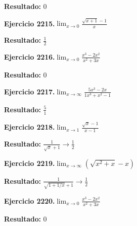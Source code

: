 \documentclass[10pt,a4paper]{article}
\begin{document}
\begin{solbox}
\textbf{Resultado:} \(\displaystyle 0\)
\end{solbox}

\begin{ejbox}
\textbf{Ejercicio 2215.}\quad $\lim_{x\to 0} \frac{\sqrt{x+1}-1}{x}$
\end{ejbox}

\begin{solbox}
\textbf{Resultado:} \(\displaystyle \frac{1}{2}\)
\end{solbox}

\newpage
\begin{ejbox}
\textbf{Ejercicio 2216.}\quad $\lim_{x\to 0} \frac{x^3-2x^2}{x^2+3x}$
\end{ejbox}

\begin{solbox}
\textbf{Resultado:} \(\displaystyle 0\)
\end{solbox}

\begin{ejbox}
\textbf{Ejercicio 2217.}\quad $\lim_{x\to \infty} \frac{5x^3 - 2x}{1x^3 + x^2 - 1}$
\end{ejbox}

\begin{solbox}
\textbf{Resultado:} \(\displaystyle \frac{5}{1}\)
\end{solbox}

\begin{ejbox}
\textbf{Ejercicio 2218.}\quad $\lim_{x\to 1} \frac{\sqrt{x}-1}{x-1}$
\end{ejbox}

\begin{solbox}
\textbf{Resultado:} \(\displaystyle \frac{1}{\sqrt{x}+1} \to \frac{1}{2}\)
\end{solbox}

\newpage
\begin{ejbox}
\textbf{Ejercicio 2219.}\quad $\lim_{x\to \infty} (\sqrt{x^2+x} - x)$
\end{ejbox}

\begin{solbox}
\textbf{Resultado:} \(\displaystyle \frac{1}{\sqrt{1+1/x}+1} \to \frac{1}{2}\)
\end{solbox}

\begin{ejbox}
\textbf{Ejercicio 2220.}\quad $\lim_{x\to 0} \frac{x^3-2x^2}{x^2+3x}$
\end{ejbox}

\begin{solbox}
\textbf{Resultado:} \(\displaystyle 0\)
\end{solbox}
\end{document}
